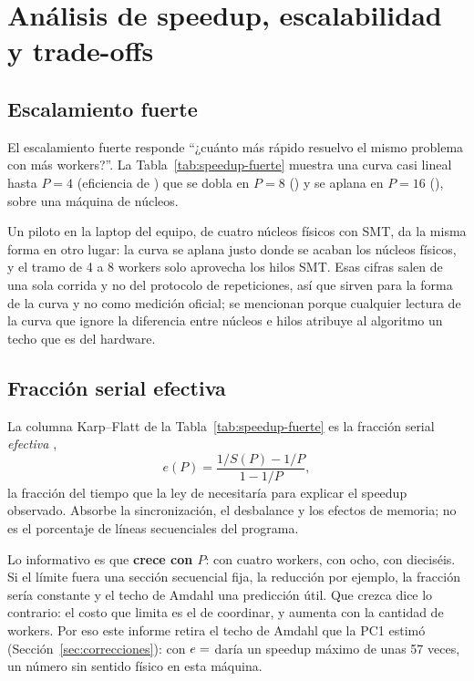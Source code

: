 \section{Análisis de speedup, escalabilidad y trade-offs}\label{sec:analisis}

\subsection{Escalamiento fuerte}

El escalamiento fuerte responde \enquote{¿cuánto más rápido resuelvo el mismo problema con más
workers?}. La Tabla~\ref{tab:speedup-fuerte} muestra una curva casi lineal hasta $P = 4$
(eficiencia de ) que se dobla en $P = 8$ () y se aplana
en $P = 16$ (), sobre una máquina de  núcleos.

Un piloto en la laptop del equipo, de cuatro núcleos físicos con SMT, da la misma forma en otro
lugar: la curva se aplana justo donde se acaban los núcleos físicos, y el tramo de 4 a 8 workers
solo aprovecha los hilos SMT. Esas cifras salen de una sola corrida y no del protocolo de
 repeticiones, así que sirven para la forma de la curva y no como medición
oficial; se mencionan porque cualquier lectura de la curva que ignore la diferencia entre núcleos e
hilos atribuye al algoritmo un techo que es del hardware.

\subsection{Fracción serial efectiva}\label{sec:karp}

La columna Karp--Flatt de la Tabla~\ref{tab:speedup-fuerte} es la fracción serial \emph{efectiva}
\parencite{karpflatt1990},
\[
  e(P) = \frac{1/S(P) - 1/P}{1 - 1/P},
\]
la fracción del tiempo que la ley de \textcite{amdahl1967} necesitaría para explicar el speedup
observado. Absorbe la sincronización, el desbalance y los efectos de memoria; no es el porcentaje de
líneas secuenciales del programa.

Lo informativo es que \textbf{crece con $P$}:  con cuatro workers,  con
ocho,  con dieciséis. Si el límite fuera una sección secuencial fija, la reducción por
ejemplo, la fracción sería constante y el techo de Amdahl una predicción útil. Que crezca dice lo
contrario: el costo que limita es el de coordinar, y aumenta con la cantidad de workers. Por eso este
informe retira el techo de Amdahl que la PC1 estimó (Sección~\ref{sec:correcciones}): con
$e = \cifra{kf-p4}$ daría un speedup máximo de unas 57 veces, un número sin sentido físico en esta
máquina.

